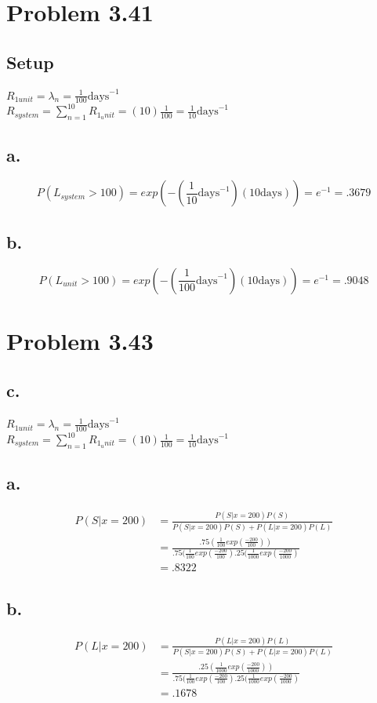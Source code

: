 \documentclass[12pt]{article}
\begin{document}
\section*{Problem 3.41}
\subsection*{Setup}
$R_{1 unit} = \lambda_n = \frac{1}{100} \textrm{days}^{-1}$ \\
$R_{system} = \sum_{n=1}^{10} R_{1_unit} = (10)\frac{1}{100} = \frac{1}{10} \textrm{days}^{-1}$

\subsection*{a.}
\[
  P(L_{system} > 100) = exp(-(\frac{1}{10} \textrm{days}^{-1})(10 \textrm{days})) = e^{-1} = .3679
\]
\subsection*{b.}
\[
  P(L_{unit} > 100) = exp(-(\frac{1}{100} \textrm{days}^{-1})(10 \textrm{days})) = e^{-1} = .9048
\]
\section*{Problem 3.43}
\subsection*{c.}
$R_{1 unit} = \lambda_n = \frac{1}{100} \textrm{days}^{-1}$ \\
$R_{system} = \sum_{n=1}^{10} R_{1_unit} = (10)\frac{1}{100} = \frac{1}{10} \textrm{days}^{-1}$

\subsection*{a.}
\begin{align*}
  P(S|x=200) &= \frac{P(S|x=200)P(S)}{P(S|x=200)P(S)+P(L|x=200)P(L)} \\
  &= \frac{.75(\frac{1}{100}exp(\frac{-200}{100}))}{.75(\frac{1}{100}exp(\frac{-200}{100})
    .25(\frac{1}{1000}exp(\frac{-200}{1000})} \\
  &= .8322
\end{align*}

\subsection*{b.}
\begin{align*}
  P(L|x=200) &= \frac{P(L|x=200)P(L)}{P(S|x=200)P(S)+P(L|x=200)P(L)} \\
  &= \frac{.25(\frac{1}{1000}exp(\frac{-200}{1000}))}{.75(\frac{1}{100}exp(\frac{-200}{100})
    .25(\frac{1}{1000}exp(\frac{-200}{1000})} \\
  &= .1678
\end{align*}
\end{document}
